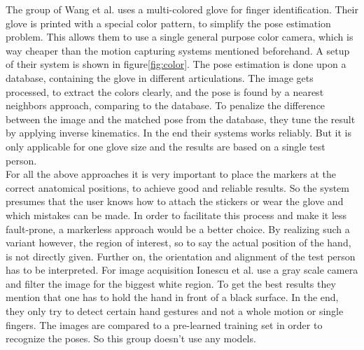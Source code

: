 The group of Wang et al. uses a multi-colored glove for finger identification. Their glove is printed with a special color pattern, to simplify the pose estimation problem. This allows them to use a single general purpose color camera, which is way cheaper than the motion capturing systems mentioned beforehand. A setup of their system is shown in figure\ref{fig:color}. The pose estimation is done upon a database, containing the glove in different articulations. The image gets processed, to extract the colors clearly, and the pose is found by a nearest neighbors approach, comparing to the database. To penalize the difference between the image and the matched pose from the database, they tune the result by applying inverse kinematics. In the end their systems works reliably. But it is only applicable for one glove size and the results are based on a single test person.\\
For all the above approaches it is very important to place the markers at the correct anatomical positions, to achieve good and reliable results. So the system presumes that the user knows how to attach the stickers or wear the glove and which mistakes can be made. In order to facilitate this process and make it less fault-prone, a markerless approach would be a better choice.
By realizing such a variant however, the region of interest, so to say the actual position of the hand, is not directly given. Further on, the orientation and alignment of the test person has to be interpreted. For image acquisition Ionescu et al. use a gray scale camera and filter the image for the biggest white region. To get the best results they mention that one has to hold the hand in front of a black surface. In the end, they only try to detect certain hand gestures and not a whole motion or single fingers. The images are compared to a pre-learned training set in order to recognize the poses. So this group doesn't use any models.\\
